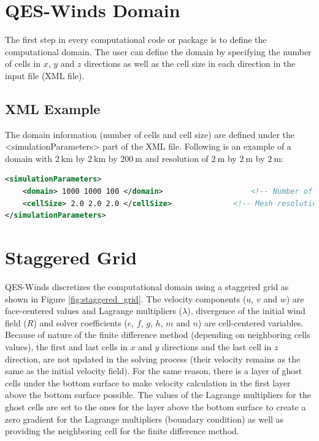 \section{QES-Winds Domain}

The first step in every computational code or package is to define the computational domain. The user can define the domain by specifying the number of cells in $x$, $y$ and $z$ directions as well as the cell size in each direction in the input file (XML file).

\subsection{XML Example}

The domain information (number of cells and cell size) are defined under the <simulationParameters> part of the XML file. Following is an example of a domain with $2\ \si{\kilo\metre}$ by $2\ \si{\kilo\metre}$ by $200\ \si{\metre}$ and resolution of $2\ \si{\metre}$ by $2\ \si{\metre}$ by $2\ \si{\metre}$:

\begin{lstlisting}[language=XML]
<simulationParameters>
  	<domain> 1000 1000 100 </domain>					<!-- Number of cells in x,y and z directions-->
  	<cellSize> 2.0 2.0 2.0 </cellSize> 				<!-- Mesh resolution (meters)-->
</simulationParameters>
\end{lstlisting}

\section{Staggered Grid}

QES-Winds discretizes the computational domain using a staggered grid as shown in Figure \ref{fig:staggered_grid}. The velocity components ($u$, $v$ and $w$) are face-centered values and Lagrange multipliers ($\lambda$), divergence of the initial wind field ($R$) and solver coefficients ($e$, $f$, $g$, $h$, $m$ and $n$) are cell-centered variables. Because of nature of the finite difference method (depending on neighboring cells values), the first and last cells in $x$ and $y$ directions and the last cell in $z$ direction, are not updated in the solving process (their velocity remains as the same as the initial velocity field). For the same reason, there is a layer of ghost cells under the bottom surface to make velocity calculation in the first layer above the bottom surface possible. The values of the Lagrange multipliers for the ghost cells are set to the ones for the layer above the bottom surface to create a zero gradient for the Lagrange multipliers (boundary condition) as well as providing the neighboring cell for the finite difference method.

